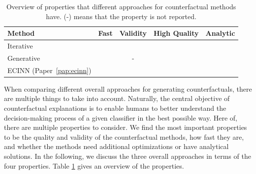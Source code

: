 \documentclass[11pt,a4paper,twoside,openright,final]{memoir}
\newcommand{\cmark}{\ding{51}}%
\newcommand{\xmark}{\ding{55}}%
\newcommand{\greencheck}{\textcolor{green}{\cmark}}
\newcommand{\redcross}{\textcolor{red}{\xmark}}
\newcommand*{\paperref}[1]{Paper~\hyperref[#1]{\ref{#1}}}
\begin{document}
\begin{table}[b]
    \centering
    \begin{tabular}{lcccc}
    \toprule
        \textbf{Method}                                                 & \textbf{Fast}    & \textbf{Validity} & \textbf{High Quality}   & \textbf{Analytic}         \\
    \midrule                                                              
        Iterative \cite{Wachter2017, Dhurandhar2018, VanLooveren2019}   & \redcross        & \redcross         &  \redcross             & \redcross                 \\
        Generative \cite{Joshi2018, Rodriguez2021, Singla2019, flowcounterfactuals}  & \greencheck      & -                 &  \greencheck           & \redcross                 \\
        ECINN (\paperref{pap:ecinn})                                    & \greencheck      & \greencheck       &  \greencheck           & \greencheck               \\
    \bottomrule
    \end{tabular}
    \caption{Overview of properties that different approaches for counterfactual methods have. (-) means that the property is not reported.}
    \label{tab:cf-method-comparison}
\end{table}

When comparing different overall approaches for generating counterfactuals, there are multiple things to take into account.
Naturally, the central objective of counterfactual explanations is to enable humans to better understand the decision-making process of a given classifier in the best possible way.
Here of, there are multiple properties to consider.
We find the most important properties to be the quality and validity of the counterfactual methods, how fast they are, and whether the methods need additional optimizations or have analytical solutions.
In the following, we discuss the three overall approaches in terms of the four properties.
Table \ref{tab:cf-method-comparison} gives an overview of the properties.
\end{document}
